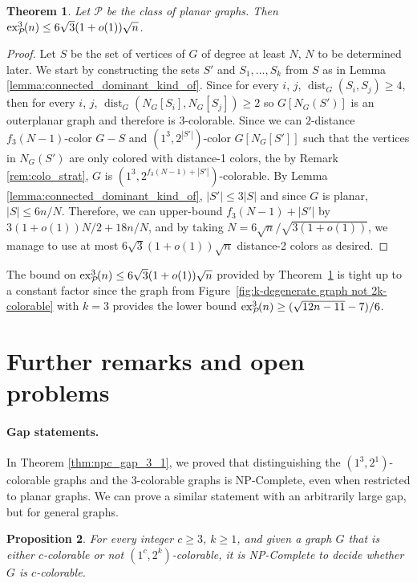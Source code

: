\documentclass{article}
\newtheorem{theorem}{Theorem}
\newtheorem{proposition}[theorem]{Proposition}
\newcommand{\dist}[0]{\operatorname{dist}}
\newcommand{\colo}[2]{(1^{#1}, 2^{#2})}
\newcommand{\ex}[3]{\operatorname{ex}^{#1}_{#2}\hspace{-3pt}{#3}}
\begin{document}
\begin{theorem}\label{thm:bound_sqrt_planar}
    Let $\mathcal{P}$ be the class of planar graphs. Then $\ex{3}{\mathcal{P}}{(n)} \le 6\sqrt{3}(1 + o(1))\sqrt{n}$.
\end{theorem}

\begin{proof}
    Let $S$ be the set of vertices of $G$ of degree at least $N$, $N$ to be determined later. We start by constructing the sets $S'$ and $S_1, \dots, S_k$ from $S$ as in Lemma \ref{lemma:connected_dominant_kind_of}. Since for every $i$, $j$, $\dist_G(S_i, S_j) \ge 4$, then for every $i$, $j$, $\dist_G(N_G[S_i], N_G[S_j]) \ge 2$ so $G[N_G(S')]$ is an outerplanar graph and therefore is $3$-colorable. Since we can $2$-distance $f_3(N - 1)$-color $G - S$ and $\colo{3}{|S'|}$-color $G[N_G[S']]$ such that the vertices in $N_G(S')$ are only colored with distance-1 colors, the by Remark \ref{rem:colo_strat}, $G$ is $\colo{3}{f_3(N - 1) + |S'|}$-colorable. By Lemma \ref{lemma:connected_dominant_kind_of}, $|S'| \le 3|S|$ and since $G$ is planar, $|S| \le 6n/N$. Therefore, we can upper-bound $f_3(N - 1) + |S'|$ by $3(1 + o(1))N/2 + 18n/N$, and by taking $N = 6\sqrt{n}/\sqrt{3(1 + o(1))}$, we manage to use at most $6\sqrt{3}(1 + o(1))\sqrt{n}$ distance-2 colors as desired.
\end{proof}

The bound on $\ex{3}{\mathcal{P}}{(n)} \leq 6\sqrt{3}(1 + o(1))\sqrt{n}$ provided by Theorem~\ref{thm:bound_sqrt_planar} is tight up to a constant factor since the graph from Figure~\ref{fig:k-degenerate graph not 2k-colorable} with $k = 3$ provides the lower bound $\ex{3}{\mathcal{P}}{(n)}\geq (\sqrt{12n - 11} - 7)/6$.

\section{Further remarks and open problems}

\paragraph{Gap statements.} In Theorem \ref{thm:npc_gap_3_1}, we proved that distinguishing the $\colo{3}{1}$-colorable graphs and the $3$-colorable graphs is NP-Complete, even when restricted to planar graphs. We can prove a similar statement with an arbitrarily large gap, but for general graphs.

\begin{proposition}\label{prop:gap_c_0_c_k}
    For every integer $c \geq 3$, $k \ge 1$,  and given a graph $G$ that is either $c$-colorable or not $\colo{c}{k}$-colorable, it is NP-Complete to decide whether $G$ is $c$-colorable.
\end{proposition}
\end{document}
